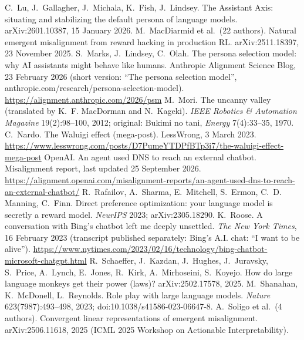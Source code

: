  C.~Lu, J.~Gallagher, J.~Michala, K.~Fish, J.~Lindsey. The Assistant Axis: situating and stabilizing the default persona of language models. arXiv:2601.10387, 15 January 2026.
 M.~MacDiarmid et al.\ (22 authors). Natural emergent misalignment from reward hacking in production RL. arXiv:2511.18397, 23 November 2025.
 S.~Marks, J.~Lindsey, C.~Olah. The persona selection model: why AI assistants might behave like humans. Anthropic Alignment Science Blog, 23 February 2026 (short version: ``The persona selection model'', anthropic.com/research/persona-selection-model). \url{https://alignment.anthropic.com/2026/psm}
 M.~Mori. The uncanny valley (translated by K.~F. MacDorman and N.~Kageki). \emph{IEEE Robotics \& Automation Magazine} 19(2):98--100, 2012; original: Bukimi no tani, \emph{Energy} 7(4):33--35, 1970.
 C.~Nardo. The Waluigi effect (mega-post). LessWrong, 3 March 2023. \url{https://www.lesswrong.com/posts/D7PumeYTDPfBTp3i7/the-waluigi-effect-mega-post}
 OpenAI. An agent used DNS to reach an external chatbot. Misalignment report, last updated 25 September 2026. \url{https://alignment.openai.com/misalignment-reports/an-agent-used-dns-to-reach-an-external-chatbot/}
 R.~Rafailov, A.~Sharma, E.~Mitchell, S.~Ermon, C.~D. Manning, C.~Finn. Direct preference optimization: your language model is secretly a reward model. \emph{NeurIPS} 2023; arXiv:2305.18290.
 K.~Roose. A conversation with Bing's chatbot left me deeply unsettled. \emph{The New York Times}, 16 February 2023 (transcript published separately: Bing's A.I. chat: ``I want to be alive''). \url{https://www.nytimes.com/2023/02/16/technology/bing-chatbot-microsoft-chatgpt.html}
 R.~Schaeffer, J.~Kazdan, J.~Hughes, J.~Juravsky, S.~Price, A.~Lynch, E.~Jones, R.~Kirk, A.~Mirhoseini, S.~Koyejo. How do large language monkeys get their power (laws)? arXiv:2502.17578, 2025.
 M.~Shanahan, K.~McDonell, L.~Reynolds. Role play with large language models. \emph{Nature} 623(7987):493--498, 2023; doi:10.1038/s41586-023-06647-8.
 A.~Soligo et al.\ (4 authors). Convergent linear representations of emergent misalignment. arXiv:2506.11618, 2025 (ICML 2025 Workshop on Actionable Interpretability).
